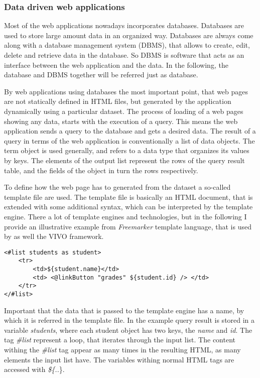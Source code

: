\subsubsection{Data driven web applications} \label{dataDriven}

Most of the web applications nowadays incorporates databases. Databases are used to store large amount data in an organized way. Databases are always come along with a database management system (DBMS), that allows to create, edit, delete and retrieve data in the database. So DBMS is software that acts as an interface between the web application and the data. In the following, the database and DBMS together will be referred just as database.  

By web applications using databases the most important point, that web pages are not statically defined in HTML files, but generated by the application dynamically using a particular dataset. The process of loading of a web pages showing any data, starts with the execution of a query. This means the web application sends a query to the database and gets a desired data. The result of a query in terms of the web application is conventionally a list of data objects.  The term object is used generally, and refers to a data type that organizes its values by keys. The elements of the output list represent the rows of the query result table, and the fields of the object in turn the rows respectively. 

To define how the web page has to generated from the dataset a so-called template file are used. The template file is basically an HTML document, that is extended with some additional syntax, which can be interpreted by the template engine. There a lot of template engines and technologies, but in the following I provide an illustrative example from \textit{Freemarker} template language, that is used by as well the VIVO framework.

\begin{lstlisting}[captionpos=b, caption=Template file example, label=skullJSON, belowskip=1em, aboveskip=2em,
basicstyle=\footnotesize,frame=single]
<#list students as student>
	<tr>
		<td>${student.name}</td>
		<td> <@linkButton "grades" ${student.id} /> </td>
	</tr>
</#list>
\end{lstlisting}

Important that the data that is passed to the template engine has a name, by which it is referred in the template file. In the example query result is stored in a variable \textit{students}, where each student object has two keys, the \textit{name} and \textit{id}. The tag \textit{\#list} represent a loop, that iterates through the input list. The content withing the \textit{\#list} tag appear as many times in the resulting HTML, as many elements the input list have. The variables withing normal HTML tags are accessed with \textit{\$\{..}\}. 

